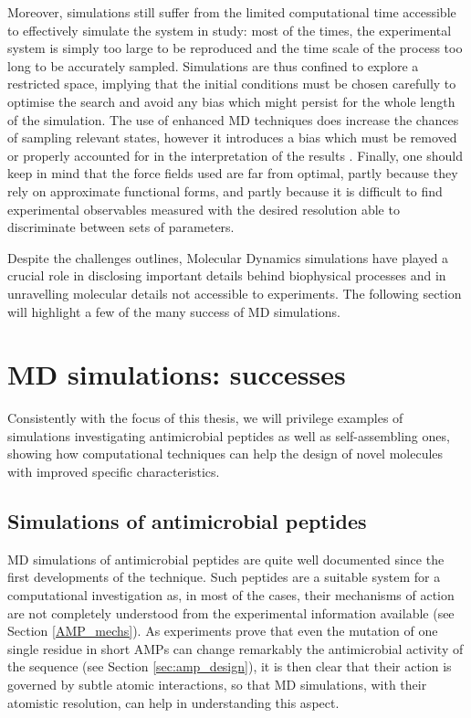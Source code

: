 Moreover, simulations still suffer from the limited computational time accessible to effectively simulate the system in study: most of the times, the experimental system is simply too large to be reproduced and the time scale of the process too long to be accurately sampled. Simulations are thus confined to explore a restricted space, implying that the initial conditions must be chosen carefully to optimise the search and avoid any bias which might persist for the whole length of the simulation. The use of enhanced MD techniques does increase the chances of sampling relevant states, however it introduces a bias which must be removed or properly accounted for in the interpretation of the results \cite{Bernardi2015,Best2005,Barducci2010,Barducci2011,Mills2008}.
Finally, one should keep in mind that the force fields used are far from optimal, partly because they rely on approximate functional forms, and partly because it is difficult to find experimental observables measured with the desired resolution able to discriminate between sets of parameters.

Despite the challenges outlines, Molecular Dynamics simulations have played a crucial role in disclosing important details behind biophysical processes and in unravelling molecular details not accessible to experiments. The following section will highlight a few of the many success of MD simulations.


\section{MD simulations: successes} \label{sec:md_lit}
Consistently with the focus of this thesis, we will privilege examples of simulations investigating antimicrobial peptides as well as self-assembling ones, showing how computational techniques can help the design of novel molecules with improved specific characteristics.

\subsection{Simulations of antimicrobial peptides}
MD simulations of antimicrobial peptides are quite well documented since the first developments of the technique. Such peptides are a suitable system for a computational investigation as, in most of the cases, their mechanisms of action are not completely understood from the experimental information available (see Section \ref{AMP_mechs}). As experiments prove that even the mutation of one single residue in short AMPs can change remarkably the antimicrobial activity of the sequence (see Section \ref{sec:amp_design}), it is then clear that their action is governed by subtle atomic interactions, so that MD simulations, with their atomistic resolution, can help in understanding this aspect.

